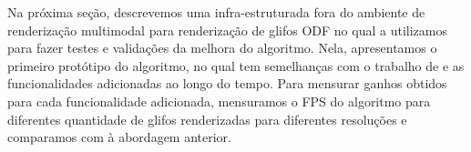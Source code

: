 \documentclass[
    12pt,                %
    oneside,            %
    a4paper,            %
    english,            %
    french,                %
    spanish,            %
    brazil                %
    ]{abntex2}
\begin{document}



Na próxima seção, descrevemos uma infra-estruturada fora do ambiente de renderização multimodal para renderização de glifos ODF no qual a utilizamos para fazer testes e validações da melhora do algoritmo. Nela, apresentamos o primeiro protótipo do algoritmo, no qual tem semelhanças com o trabalho de  e as funcionalidades adicionadas ao longo do tempo. Para mensurar ganhos obtidos para cada funcionalidade adicionada, mensuramos o FPS do algoritmo para diferentes quantidade de glifos renderizadas para diferentes resoluções e comparamos com à abordagem anterior.

\end{document}
